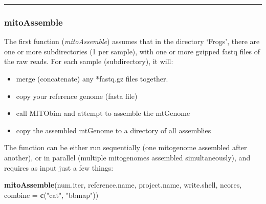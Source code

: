 \documentclass[
]{article}
\newenvironment{Shaded}{\begin{snugshade}}{\end{snugshade}}
\newcommand{\DataTypeTok}[1]{\textcolor[rgb]{0.13,0.29,0.53}{#1}}
\newcommand{\KeywordTok}[1]{\textcolor[rgb]{0.13,0.29,0.53}{\textbf{#1}}}
\newcommand{\NormalTok}[1]{#1}
\newcommand{\StringTok}[1]{\textcolor[rgb]{0.31,0.60,0.02}{#1}}
\providecommand{\tightlist}{%
  \setlength{\itemsep}{0pt}\setlength{\parskip}{0pt}}
\begin{document}
\begin{center}\rule{0.5\linewidth}{0.5pt}\end{center}

\hypertarget{mitoassemble}{%
\subsubsection{mitoAssemble}\label{mitoassemble}}

The first function (\emph{mitoAssemble}) assumes that in the directory
`Frogs', there are one or more subdirectories (1 per sample), with one
or more gzipped fastq files of the raw reads. For each sample
(subdirectory), it will:

\begin{itemize}
\tightlist
\item
  merge (concatenate) any *fastq.gz files together.\\
\item
  copy your reference genome (fasta file)\\
\item
  call MITObim and attempt to assemble the mtGenome\\
\item
  copy the assembled mtGenome to a directory of all assemblies
\end{itemize}

The function can be either run sequentially (one mitogenome assembled
after another), or in parallel (multiple mitogenomes assembled
simultaneously), and requires as input just a few things:

\begin{Shaded}
\begin{Highlighting}[]
\KeywordTok{mitoAssemble}\NormalTok{(num.iter, reference.name, project.name,}
\NormalTok{             write.shell, ncores, }\DataTypeTok{combine =} \KeywordTok{c}\NormalTok{(}\StringTok{"cat"}\NormalTok{, }\StringTok{"bbmap"}\NormalTok{))}
\end{Highlighting}
\end{Shaded}
\end{document}
